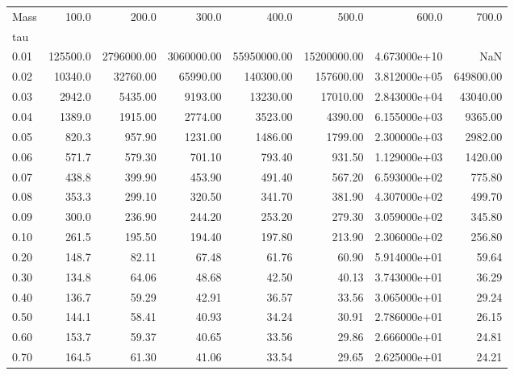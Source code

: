 \begin{tabular}{lrrrrrrr}
\toprule
Mass &     100.0 &       200.0 &       300.0 &        400.0 &        500.0 &         600.0 &      700.0 \\
tau   &           &             &             &              &              &               &            \\
\midrule
0.01  &  125500.0 &  2796000.00 &  3060000.00 &  55950000.00 &  15200000.00 &  4.673000e+10 &        NaN \\
0.02  &   10340.0 &    32760.00 &    65990.00 &    140300.00 &    157600.00 &  3.812000e+05 &  649800.00 \\
0.03  &    2942.0 &     5435.00 &     9193.00 &     13230.00 &     17010.00 &  2.843000e+04 &   43040.00 \\
0.04  &    1389.0 &     1915.00 &     2774.00 &      3523.00 &      4390.00 &  6.155000e+03 &    9365.00 \\
0.05  &     820.3 &      957.90 &     1231.00 &      1486.00 &      1799.00 &  2.300000e+03 &    2982.00 \\
0.06  &     571.7 &      579.30 &      701.10 &       793.40 &       931.50 &  1.129000e+03 &    1420.00 \\
0.07  &     438.8 &      399.90 &      453.90 &       491.40 &       567.20 &  6.593000e+02 &     775.80 \\
0.08  &     353.3 &      299.10 &      320.50 &       341.70 &       381.90 &  4.307000e+02 &     499.70 \\
0.09  &     300.0 &      236.90 &      244.20 &       253.20 &       279.30 &  3.059000e+02 &     345.80 \\
0.10  &     261.5 &      195.50 &      194.40 &       197.80 &       213.90 &  2.306000e+02 &     256.80 \\
0.20  &     148.7 &       82.11 &       67.48 &        61.76 &        60.90 &  5.914000e+01 &      59.64 \\
0.30  &     134.8 &       64.06 &       48.68 &        42.50 &        40.13 &  3.743000e+01 &      36.29 \\
0.40  &     136.7 &       59.29 &       42.91 &        36.57 &        33.56 &  3.065000e+01 &      29.24 \\
0.50  &     144.1 &       58.41 &       40.93 &        34.24 &        30.91 &  2.786000e+01 &      26.15 \\
0.60  &     153.7 &       59.37 &       40.65 &        33.56 &        29.86 &  2.666000e+01 &      24.81 \\
0.70  &     164.5 &       61.30 &       41.06 &        33.54 &        29.65 &  2.625000e+01 &      24.21 \\

\end{tabular}
